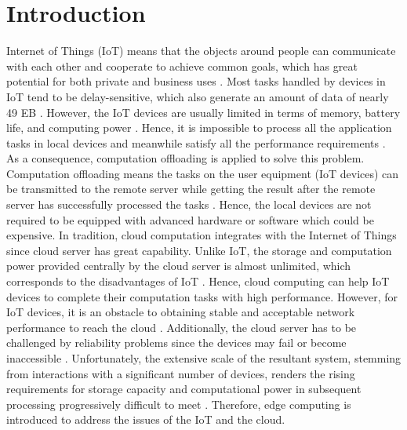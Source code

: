 \documentclass[a4paper,11pt]{article}
\begin{document}
\section{Introduction}

Internet of Things (IoT) means that the objects around people can communicate with each other and cooperate to achieve common goals, which has great potential for both private and business uses \cite{iot}. Most tasks handled by devices in IoT tend to be delay-sensitive, which also generate an amount of data of nearly 49 EB \cite{Distributed_Offloading_in_Overlapping_Areas}. However, the IoT devices are usually limited in terms of memory, battery life, and computing power \cite{Internet_of_Things_offloading_Ongoing_issues, A_Cooperative_Partial_Computation_Offloading_Scheme_for_Mobile_Edge}. Hence, it is impossible to process all the application tasks in local devices and meanwhile satisfy all the performance requirements \cite{Distributed_Offloading_in_Overlapping_Areas}. As a consequence, computation offloading is applied to solve this problem. Computation offloading means the tasks on the user equipment (IoT devices) can be transmitted to the remote server while getting the result after the remote server has successfully processed the tasks \cite{offloading_strategy}. Hence, the local devices are not required to be equipped with advanced hardware or software which could be expensive. \newline\newline
In tradition, cloud computation integrates with the Internet of Things since cloud server has great capability. Unlike IoT, the storage and computation power provided centrally by the cloud server is almost unlimited, which corresponds to the disadvantages of IoT \cite{cloud_advatange,cloud_central}. Hence, cloud computing can help IoT devices to complete their computation tasks with high performance. However, for IoT devices, it is an obstacle to obtaining stable and acceptable network performance to reach the cloud \cite{cloud_advatange_and_problem}. Additionally, the cloud server has to be challenged by reliability problems since the devices may fail or become inaccessible \cite{cloud_advatange_and_problem}. Unfortunately, the extensive scale of the resultant system, stemming from interactions with a significant number of devices, renders the rising requirements for storage capacity and computational power in subsequent processing progressively difficult to meet \cite{cloud_advatange_and_problem}. Therefore, edge computing is introduced to address the issues of the IoT and the cloud. \newline\newline
\end{document}
